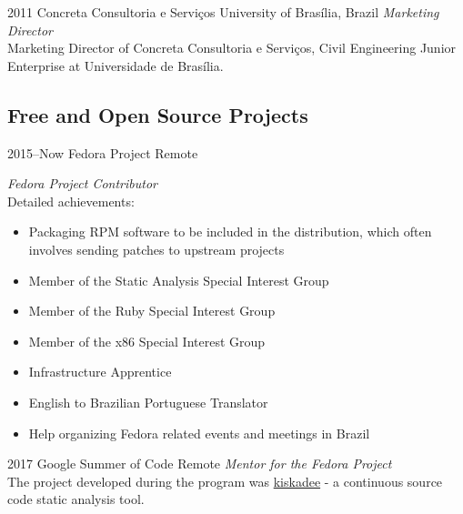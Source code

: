 \documentclass[]{friggeri-cv} %
\begin{document}
\begin{entrylist}


\entry
{2011}
{Concreta Consultoria e Serviços}
{University of Brasília, Brazil}
{\emph{Marketing Director} \\
Marketing Director of Concreta Consultoria e Serviços, Civil Engineering Junior
  Enterprise at Universidade de Brasília. \\
}


\end{entrylist}

\subsection{Free and Open Source Projects}

\begin{entrylist}

\entry
{2015--Now}
{Fedora Project}
{Remote}
{\emph{Fedora Project Contributor} \\
Detailed achievements:
  \begin{itemize}
    \item Packaging RPM software to be included in the distribution, which often involves sending patches to upstream projects
    \item Member of the Static Analysis Special Interest Group
    \item Member of the Ruby Special Interest Group
    \item Member of the x86 Special Interest Group
    \item Infrastructure Apprentice
    \item English to Brazilian Portuguese Translator
    \item Help organizing Fedora related events and meetings in Brazil
  \end{itemize}}


\entry
{2017}
{Google Summer of Code}
{Remote}
{\emph{Mentor for the Fedora Project} \\
  The project developed during the program was
  \href{pagure.io/kiskadee}{kiskadee} - a continuous source code static
  analysis tool. \\
 }


\end{entrylist}
\end{document}
